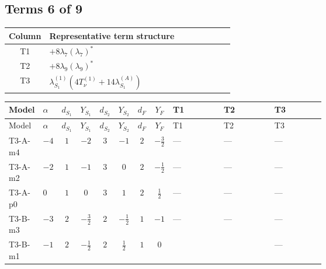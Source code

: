 \documentclass[8pt]{article}
\begin{document}
\begin{landscape}
\subsection*{Terms 6 of 9}
\begin{center}
\begin{tabular}{@{}c >{\raggedright\arraybackslash}p{0.82\linewidth}@{}}
\toprule
Column & Representative term structure \\
\midrule
T1 & \(\displaystyle +8 {\lambda_{7}} \left({\lambda_{7}}\right)^{*}\) \\
\midrule
T2 & \(\displaystyle +8 {\lambda_{9}} \left({\lambda_{9}}\right)^{*}\) \\
\midrule
T3 & \(\displaystyle {\lambda_{S_1}^{(1)}} (4 T_{\nu}^{(1)}+14 {\lambda_{S_1}^{(A)}})\) \\
\midrule
\bottomrule
\end{tabular}
\end{center}
\smallskip
\tiny
\begin{longtable}{@{}llcccccc >{\raggedright\arraybackslash}p{0.21\linewidth} >{\raggedright\arraybackslash}p{0.21\linewidth} >{\raggedright\arraybackslash}p{0.21\linewidth}@{}}
\toprule
Model & $\alpha$ & $d_{S_1}$ & $Y_{S_1}$ & $d_{S_2}$ & $Y_{S_2}$ & $d_F$ & $Y_F$ & T1 & T2 & T3 \\
\midrule
\endfirsthead
\toprule
Model & $\alpha$ & $d_{S_1}$ & $Y_{S_1}$ & $d_{S_2}$ & $Y_{S_2}$ & $d_F$ & $Y_F$ & T1 & T2 & T3 \\
\midrule
\endhead
T3-A-m4 & $-4$ & $1$ & $-2$ & $3$ & $-1$ & $2$ & $-\frac{3}{2}$ & --- & --- & --- \\
\midrule
T3-A-m2 & $-2$ & $1$ & $-1$ & $3$ & $0$ & $2$ & $-\frac{1}{2}$ & --- & --- & --- \\
\midrule
T3-A-p0 & $0$ & $1$ & $0$ & $3$ & $1$ & $2$ & $\frac{1}{2}$ & --- & --- & --- \\
\midrule
T3-B-m3 & $-3$ & $2$ & $-\frac{3}{2}$ & $2$ & $-\frac{1}{2}$ & $1$ & $-1$ & --- & --- & --- \\
\midrule
T3-B-m1 & $-1$ & $2$ & $-\frac{1}{2}$ & $2$ & $\frac{1}{2}$ & $1$ & $0$ & \scriptsize\adjustbox{max width=\linewidth}{$\begin{gathered} +8 {\lambda_{7}} \left({\lambda_{7}}\right)^{*}\end{gathered}$} & \scriptsize\adjustbox{max width=\linewidth}{$\begin{gathered} +8 {\lambda_{9}} \left({\lambda_{9}}\right)^{*}\end{gathered}$} & --- \\

\end{longtable}
\end{landscape}
\end{document}

